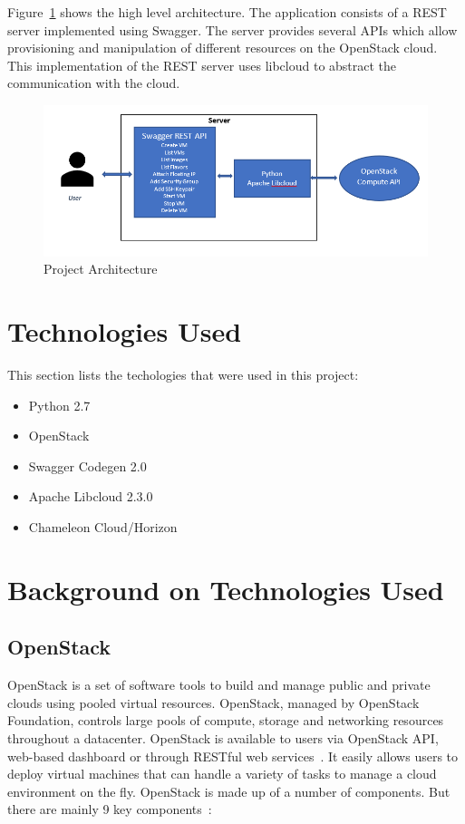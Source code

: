 Figure~\ref{fig:project-architecture} shows the high level architecture. The 
application consists of a REST server implemented using Swagger. The server
provides several APIs which allow provisioning and manipulation of different
resources on the OpenStack cloud. This implementation of the REST server uses 
libcloud to abstract the communication with the cloud. 

\begin{figure}[!ht]
        \centering\includegraphics[width=\columnwidth]
        {images/proj-architecture.PNG}
        \caption{Project Architecture}\label{fig:project-architecture}
\end{figure}

\section{Technologies Used}
This section lists the techologies that were used in this project:
\begin{itemize}
\item Python 2.7
\item OpenStack 
\item Swagger Codegen 2.0
\item Apache Libcloud 2.3.0
\item Chameleon Cloud/Horizon
\end{itemize}

\section{Background on Technologies Used}

\subsection{OpenStack}
OpenStack is a set of software tools to build and manage public and private
clouds using pooled virtual resources. OpenStack, managed by OpenStack
Foundation, controls large pools of compute, storage and networking resources
throughout a datacenter. OpenStack is available to users via OpenStack API,
web-based dashboard or through RESTful web
services~\cite{hid-sp18-516-www-wiki-openstack}. It easily allows users to
deploy virtual machines that can handle a variety of tasks to manage a cloud
environment on the fly. OpenStack is made up of a number of components. But
there are mainly 9 key components~\cite{hid-sp18-516-www-opensource}:

